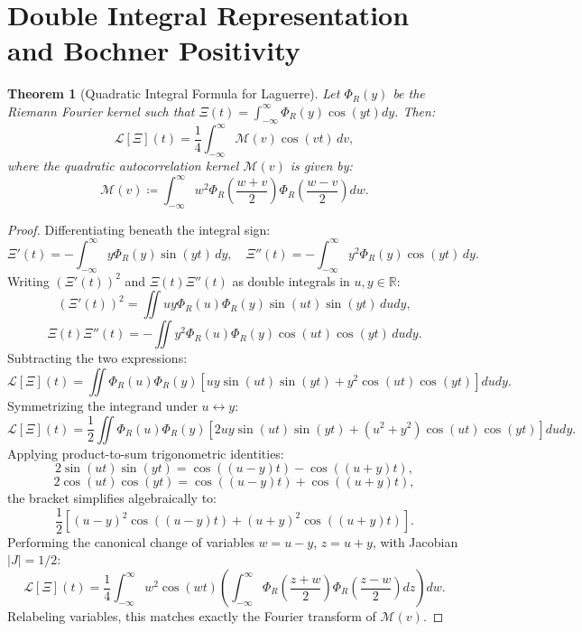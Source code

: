 \documentclass[11pt,a4paper]{article}
\newtheorem{theorem}{Theorem}[section]
\theoremstyle{definition}
\theoremstyle{remark}
\begin{document}
\section{Double Integral Representation and Bochner Positivity}

\begin{theorem}[Quadratic Integral Formula for Laguerre]
Let $\Phi_R(y)$ be the Riemann Fourier kernel such that $\Xi(t) = \int_{-\infty}^\infty \Phi_R(y) \cos(yt) dy$. Then:
\begin{equation}
\mathcal{L}[\Xi](t) = \frac{1}{4}\int_{-\infty}^\infty \mathcal{M}(v) \cos(vt)\, dv,
\end{equation}
where the quadratic autocorrelation kernel $\mathcal{M}(v)$ is given by:
\begin{equation}
\mathcal{M}(v) \coloneqq \int_{-\infty}^\infty w^2 \Phi_R\left(\frac{w+v}{2}\right) \Phi_R\left(\frac{w-v}{2}\right) dw.
\end{equation}
\end{theorem}

\begin{proof}
Differentiating beneath the integral sign:
\[
\Xi'(t) = -\int_{-\infty}^\infty y \Phi_R(y) \sin(yt)\, dy, \quad \Xi''(t) = -\int_{-\infty}^\infty y^2 \Phi_R(y) \cos(yt)\, dy.
\]
Writing $(\Xi'(t))^2$ and $\Xi(t)\Xi''(t)$ as double integrals in $u, y \in \mathbb{R}$:
\[
(\Xi'(t))^2 = \iint u y \Phi_R(u)\Phi_R(y) \sin(ut)\sin(yt)\, du dy,
\]
\[
\Xi(t)\Xi''(t) = -\iint y^2 \Phi_R(u)\Phi_R(y) \cos(ut)\cos(yt)\, du dy.
\]
Subtracting the two expressions:
\[
\mathcal{L}[\Xi](t) = \iint \Phi_R(u)\Phi_R(y) \left[ u y \sin(ut)\sin(yt) + y^2 \cos(ut)\cos(yt) \right] du dy.
\]
Symmetrizing the integrand under $u \leftrightarrow y$:
\[
\mathcal{L}[\Xi](t) = \frac{1}{2} \iint \Phi_R(u)\Phi_R(y) \left[ 2 u y \sin(ut)\sin(yt) + (u^2 + y^2) \cos(ut)\cos(yt) \right] du dy.
\]
Applying product-to-sum trigonometric identities:
\[
2\sin(ut)\sin(yt) = \cos((u-y)t) - \cos((u+y)t),
\]
\[
2\cos(ut)\cos(yt) = \cos((u-y)t) + \cos((u+y)t),
\]
the bracket simplifies algebraically to:
\[
\frac{1}{2} \left[ (u - y)^2 \cos((u-y)t) + (u + y)^2 \cos((u+y)t) \right].
\]
Performing the canonical change of variables $w = u - y$, $z = u + y$, with Jacobian $|J| = 1/2$:
\[
\mathcal{L}[\Xi](t) = \frac{1}{4} \int_{-\infty}^\infty w^2 \cos(wt) \left( \int_{-\infty}^\infty \Phi_R\left(\frac{z+w}{2}\right) \Phi_R\left(\frac{z-w}{2}\right) dz \right) dw.
\]
Relabeling variables, this matches exactly the Fourier transform of $\mathcal{M}(v)$.
\end{proof}
\end{document}
